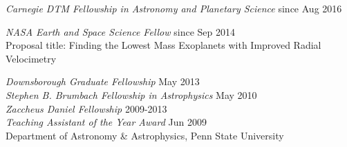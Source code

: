 \begin{small}


{\sl Carnegie DTM Fellowship in Astronomy and Planetary Science} \hfill     since Aug 2016
\vspace{10pt}

{\sl NASA Earth and Space Science Fellow} \hfill     since Sep 2014 \\
Proposal title: Finding the Lowest Mass Exoplanets with Improved
Radial Velocimetry
\vspace{10pt}

{\sl Downsborough Graduate Fellowship} \hfill        May 2013 \\
{\sl Stephen B. Brumbach Fellowship in Astrophysics} \hfill        May 2010 \\
{\sl Zaccheus Daniel Fellowship} \hfill        2009-2013 \\
{\sl Teaching Assistant of the Year Award} \hfill        Jun 2009 \\
Department of Astronomy \& Astrophysics, Penn State University

\begin{comment}   
\newpage
\topic{\centerline{TELESCOPE TIME AWARDED AND OBSERVING EXPERIENCE}} 


{\bf Exoplanet Programs}

PI, 25.7 hours on Hobby-Eberly Telescope, with the High Resolution Spectrograph \hfill 2013 \\
{\it Improve the Radial Velocity Precision of HET/HRS}\\
Co-I: Jason Wright, Ming Zhao
\vspace{10pt}

Observer, Observing Planner, Tull Spectrograph at the McDonald Obs.\ 2.7m
Telescope \hfill 2013\\
TS12 arm, R$\sim$500,000, day-time runs
\vspace{10pt}

Observer, Keck/HIRES remote observing at Caltech and Yale ROCs \hfill 2010, 2011, 2013\\
\vspace{10pt}

{\bf Extragalactic Programs}

As founding member of the MUSSCEL program (MUltiwavelength Study of the
Structure, Chemistry and Evolution of LSB galaxies):
\vspace{10pt}

Co-I, 5 hours of Green Bank Telescope, 2015A with AUGUS receiver
\hfill 2014 \\
{\it CO in Low Surface Brightness Galaxies in Tandem with Optical/UV Star Formation}\\
PI: Jason Young, Co-Is: Rachel Kuzio de Naray, Karen O'Neil
\vspace{10pt}


\end{comment}
\end{small}
